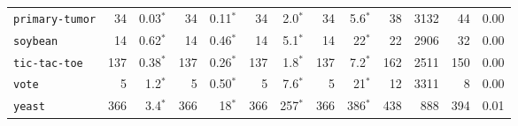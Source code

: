\begin{tabular}{lrrrrrrrrrrrr}
\texttt{primary-tumor} & 34 & 0.03$^*$ & 34 & 0.11$^*$ & 34 & 2.0$^*$ & 34 & 5.6$^*$ & 38 & 3132 & 44 & 0.00\\
\texttt{soybean} & 14 & 0.62$^*$ & 14 & 0.46$^*$ & 14 & 5.1$^*$ & 14 & 22$^*$ & 22 & 2906 & 32 & 0.00\\
\texttt{tic-tac-toe} & 137 & 0.38$^*$ & 137 & 0.26$^*$ & 137 & 1.8$^*$ & 137 & 7.2$^*$ & 162 & 2511 & 150 & 0.00\\
\texttt{vote} & 5 & 1.2$^*$ & 5 & 0.50$^*$ & 5 & 7.6$^*$ & 5 & 21$^*$ & 12 & 3311 & 8 & 0.00\\
\texttt{yeast} & 366 & 3.4$^*$ & 366 & 18$^*$ & 366 & 257$^*$ & 366 & 386$^*$ & 438 & 888 & 394 & 0.01\\
\bottomrule
\end{tabular}
